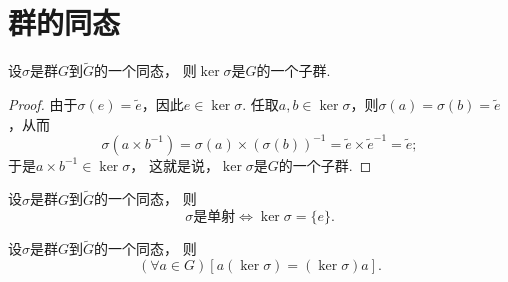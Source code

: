 \section{群的同态}


\begin{theorem}
设\(\sigma\)是群\(G\)到\(\tilde{G}\)的一个同态，
则\(\ker\sigma\)是\(G\)的一个子群.
\begin{proof}
由于\(\sigma(e)=\tilde{e}\)，因此\(e\in\ker\sigma\).
任取\(a,b\in\ker\sigma\)，则\(\sigma(a)=\sigma(b)=\tilde{e}\)，从而\[
	\sigma(a \times b^{-1}) = \sigma(a) \times (\sigma(b))^{-1}
	= \tilde{e} \times \tilde{e}^{-1}
	= \tilde{e};
\]
于是\(a \times b^{-1} \in \ker\sigma\)，
这就是说，\(\ker\sigma\)是\(G\)的一个子群.
\end{proof}
\end{theorem}

\begin{theorem}
设\(\sigma\)是群\(G\)到\(\tilde{G}\)的一个同态，
则\[
	\text{\(\sigma\)是单射}
	\iff
	\ker\sigma=\{e\}.
\]
\end{theorem}

\begin{theorem}
设\(\sigma\)是群\(G\)到\(\tilde{G}\)的一个同态，
则\[
	(\forall a \in G)[a(\ker\sigma)=(\ker\sigma)a].
\]
\end{theorem}
